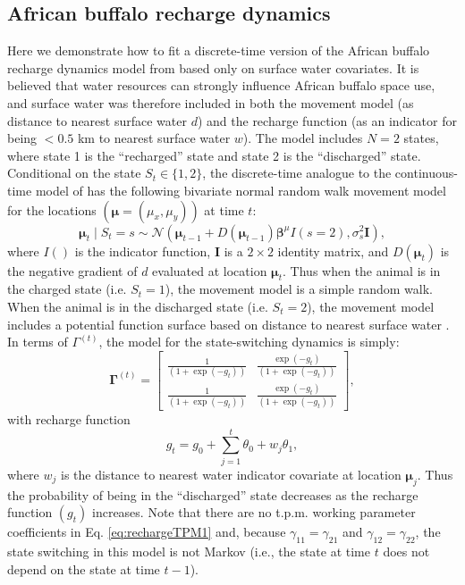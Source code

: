 \documentclass[12pt]{article}\usepackage[]{graphicx}\usepackage[]{color}
\begin{document}
\subsection{African buffalo recharge dynamics}
\label{sec:buffalo}
Here we demonstrate how to fit a discrete-time version of the African buffalo recharge dynamics model from \cite{HootenEtAl2019} based only on surface water covariates. It is believed that water resources can strongly influence African buffalo space use, and surface water was therefore included in both the movement model (as distance to nearest surface water $d$) and the recharge function (as an indicator for being $<0.5$ km to nearest surface water $w$). The model includes $N=2$ states, where state 1 is the ``recharged'' state and state 2 is the ``discharged'' state. Conditional on the state $S_t \in \{1,2\}$, the discrete-time analogue to the continuous-time model of \cite{HootenEtAl2019} has the following bivariate normal random walk movement model for the locations $({\boldsymbol \mu}=(\mu_x,\mu_y))$ at time $t$:
\begin{equation*}
  {\boldsymbol \mu}_t \mid S_t=s \sim \mathcal{N}\left( {\boldsymbol \mu}_{t-1}+D({\boldsymbol \mu}_{t-1}){\boldsymbol \beta}^\mu I(s=2),\sigma_s^2 {\mathbf I} \right),
\end{equation*}
where $I()$ is the indicator function, $\mathbf I$ is a $2 \times 2$ identity matrix, and $D({\boldsymbol \mu}_t)$ is the negative gradient of $d$ evaluated at location ${\boldsymbol \mu}_t$. %
Thus when the animal is in the charged state (i.e. $S_t=1$), the movement model is a simple random walk. When the animal is in the discharged state (i.e. $S_t=2$), the movement model includes a potential function surface based on distance to nearest surface water \citep[for more on potential functions see][and sections \ref{sec:turtle} and \ref{sec:avoidLand}]{BrillingerEtAl2012,HootenEtAl2017,HootenEtAl2019}. In terms of $\Gamma^{(t)}$, the model for the state-switching dynamics is simply:
\begin{equation}
  {\mathbf \Gamma^{(t)}} = \begin{bmatrix}
    \frac{1}{(1+\exp(-g_t))} & \frac{\exp(-g_t)}{(1+\exp(-g_t))}  \\
    \frac{1}{(1+\exp(-g_t))} & \frac{\exp(-g_t)}{(1+\exp(-g_t))} 
  \end{bmatrix},
  \label{eq:rechargeTPM1}
\end{equation}
with recharge function
\begin{equation*}
  g_t = g_0 + \sum_{j=1}^t \theta_0 + w_j \theta_1,
\end{equation*}
where $w_j$ is the distance to nearest water indicator covariate at location ${\boldsymbol \mu}_j$. Thus the probability of being in the ``discharged'' state decreases as the recharge function $(g_t)$ increases. Note that there are no t.p.m. working parameter coefficients in Eq. \ref{eq:rechargeTPM1} and, because $\gamma_{11}=\gamma_{21}$ and $\gamma_{12}=\gamma_{22}$, the state switching in this model is not Markov (i.e., the state at time $t$ does not depend on the state at time $t-1$). 
\end{document}

